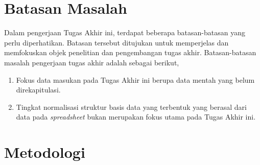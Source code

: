 \section{Batasan Masalah}

Dalam pengerjaan Tugas Akhir ini, terdapat beberapa batasan-batasan yang perlu diperhatikan. Batasan tersebut ditujukan untuk memperjelas dan memfokuskan objek penelitian dan pengembangan tugas akhir. Batasan-batasan masalah pengerjaan tugas akhir adalah sebagai berikut,

\begin{enumerate}
    \item Fokus data masukan pada Tugas Akhir ini berupa data mentah yang belum direkapitulasi.
    \item Tingkat normalisasi struktur basis data yang terbentuk yang berasal dari data pada \textit{spreadsheet} bukan merupakan fokus utama pada Tugas Akhir ini.
\end{enumerate}

\section{Metodologi}

